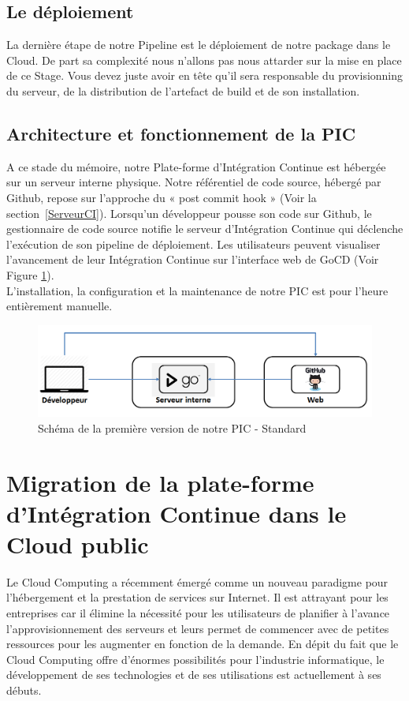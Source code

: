       \subsection{Le déploiement}
      La dernière étape de notre Pipeline est le déploiement de notre package dans le Cloud. De part sa complexité nous n'allons pas nous attarder sur la mise en place de ce Stage. Vous devez juste avoir en tête qu'il sera responsable du provisionning du serveur, de la distribution de l'artefact de build et de son installation.

      \subsection{Architecture et fonctionnement de la PIC}
      A ce stade du mémoire, notre Plate-forme d'Intégration Continue est hébergée sur un serveur interne physique. Notre référentiel de code source, hébergé par Github, repose sur l'approche du « post commit hook » (Voir la section~\ref{ServeurCI}). Lorsqu'un développeur pousse son code sur Github, le gestionnaire de code source notifie le serveur d'Intégration Continue qui déclenche l'exécution de son pipeline de déploiement. Les utilisateurs peuvent visualiser l'avancement de leur Intégration Continue sur l'interface web de GoCD (Voir Figure \ref{PICv1}).\\

      L'installation, la configuration et la maintenance de notre PIC est pour l'heure entièrement manuelle.\\

      \begin{figure}
        \begin{center}
          \includegraphics[scale=0.5]{images/PICv1.png}
        \end{center}
        \caption{Schéma de la première version de notre PIC - Standard}
        \label{PICv1}
      \end{figure}

    \section{Migration de la plate-forme d'Intégration Continue dans le Cloud public}
    Le Cloud Computing a récemment émergé comme un nouveau paradigme pour l'hébergement et la prestation de services sur Internet. Il est attrayant pour les entreprises car il élimine la nécessité pour les utilisateurs de planifier à l'avance l'approvisionnement des serveurs et leurs permet de commencer avec de petites ressources pour les augmenter en fonction de la demande. En dépit du fait que le Cloud Computing offre d'énormes possibilités pour l'industrie informatique, le développement de ses technologies et de ses utilisations est actuellement à ses débuts.

